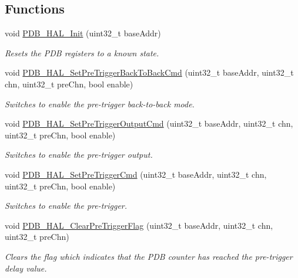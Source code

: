 \subsection*{Functions}
\begin{DoxyCompactItemize}
\item 
void \hyperlink{group__pdb__hal_ga683d4e2dfdd5f5555cd8d4995340e45a}{P\+D\+B\+\_\+\+H\+A\+L\+\_\+\+Init} (uint32\+\_\+t base\+Addr)
\begin{DoxyCompactList}\small\item\em Resets the P\+DB registers to a known state. \end{DoxyCompactList}\item 
void \hyperlink{group__pdb__hal_gaf63cd59a44d0692383a3158040bbaf02}{P\+D\+B\+\_\+\+H\+A\+L\+\_\+\+Set\+Pre\+Trigger\+Back\+To\+Back\+Cmd} (uint32\+\_\+t base\+Addr, uint32\+\_\+t chn, uint32\+\_\+t pre\+Chn, bool enable)
\begin{DoxyCompactList}\small\item\em Switches to enable the pre-\/trigger back-\/to-\/back mode. \end{DoxyCompactList}\item 
void \hyperlink{group__pdb__hal_gabcb4cd84d67c908882f7729fb0a5f1c0}{P\+D\+B\+\_\+\+H\+A\+L\+\_\+\+Set\+Pre\+Trigger\+Output\+Cmd} (uint32\+\_\+t base\+Addr, uint32\+\_\+t chn, uint32\+\_\+t pre\+Chn, bool enable)
\begin{DoxyCompactList}\small\item\em Switches to enable the pre-\/trigger output. \end{DoxyCompactList}\item 
void \hyperlink{group__pdb__hal_ga40fe32a5922373838d10ca464de532a4}{P\+D\+B\+\_\+\+H\+A\+L\+\_\+\+Set\+Pre\+Trigger\+Cmd} (uint32\+\_\+t base\+Addr, uint32\+\_\+t chn, uint32\+\_\+t pre\+Chn, bool enable)
\begin{DoxyCompactList}\small\item\em Switches to enable the pre-\/trigger. \end{DoxyCompactList}\item 
void \hyperlink{group__pdb__hal_ga6ffffda960f2c32f1a3f60d87a184692}{P\+D\+B\+\_\+\+H\+A\+L\+\_\+\+Clear\+Pre\+Trigger\+Flag} (uint32\+\_\+t base\+Addr, uint32\+\_\+t chn, uint32\+\_\+t pre\+Chn)
\begin{DoxyCompactList}\small\item\em Clears the flag which indicates that the P\+DB counter has reached the pre-\/trigger delay value. \end{DoxyCompactList}\item 

\end{DoxyCompactItemize}

